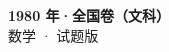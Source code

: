 \documentclass[zihao=-4, a4paper]{ctexart}
\begin{document}
\begin{center}
  {\Large\bfseries 1980 年·全国卷（文科）}\\[4pt]
  {\large 数学 · 试题版}
\end{center}
\medskip
{}

\end{document}
